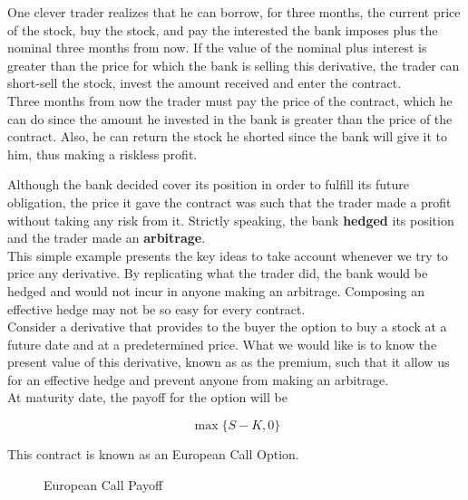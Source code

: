 \documentclass[11pt]{report}
\begin{document}
 One clever trader realizes that he can borrow, for three months, the current price of the stock, buy the stock, and pay the interested the bank imposes plus the nominal three months from now. If the value of the nominal plus interest is greater than the price for which the bank is selling this derivative, the trader can short-sell the stock, invest the amount received and enter the contract.\\
 
  Three months from now the trader must pay the price of the contract, which he can do since the amount he invested in the bank is greater than the price of the contract. Also, he can return the stock he shorted since the bank will give it to him, thus making a riskless profit.
  
\newpage

Although the bank decided cover its position in order to fulfill its future obligation, the price it gave the contract was such that the trader made a profit without taking any risk from it. Strictly speaking, the bank \textbf{hedged} its position and the trader made an \textbf{arbitrage}.\\

This simple example presents the key ideas to take account whenever we try to price any derivative. By replicating what the trader did, the bank would be hedged and would not incur in anyone making an arbitrage. Composing an effective hedge may not be so easy for every contract.\\

Consider a derivative that provides to the buyer the option to buy a stock at a future date and at a predetermined price. What we would like is to know the present value of this derivative, known as as the premium, such that it allow us for an effective hedge and prevent anyone from making an arbitrage.\\

At maturity date, the payoff for the option will be

\begin{equation}
	\max\{S-K, 0\}
\end{equation}

This contract is known as an European Call Option.

\begin{figure}[h]
	\centering
	
	\caption{European Call Payoff}
\end{figure}
\end{document}
